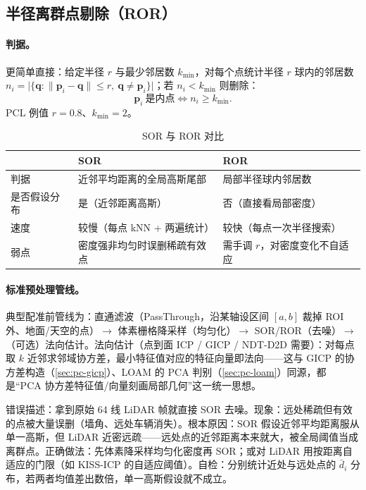 \subsection{半径离群点剔除（ROR）}
\label{sec:pc-ror}

\paragraph{判据。}
更简单直接：给定半径 $r$ 与最少邻居数 $k_{\min}$，对每个点统计半径 $r$ 球内的邻居数 $n_i=\big|\{\mathbf{q}:\|\mathbf{p}_i-\mathbf{q}\|\le r,\ \mathbf{q}\ne\mathbf{p}_i\}\big|$；若 $n_i<k_{\min}$ 则删除：
\begin{equation}
  \mathbf{p}_i\ \text{是内点}\iff n_i\ge k_{\min}.
  \label{eq:pc-ror}
\end{equation}
PCL 例值 $r=0.8$、$k_{\min}=2$\cite{rusu2011pcl}。

\begin{table}[H]\centering\small
\caption{SOR 与 ROR 对比}
\label{tab:pc-sor-ror}
\begin{tabular}{lll}
\toprule
 & SOR & ROR \\
\midrule
判据 & 近邻平均距离的全局高斯尾部 & 局部半径球内邻居数 \\
是否假设分布 & 是（近邻距离高斯） & 否（直接看局部密度） \\
速度 & 较慢（每点 kNN + 两遍统计） & 较快（每点一次半径搜索） \\
弱点 & 密度强非均匀时误删稀疏有效点 & 需手调 $r$，对密度变化不自适应 \\
\bottomrule
\end{tabular}
\end{table}

\paragraph{标准预处理管线。}
典型配准前管线为：直通滤波（PassThrough，沿某轴设区间 $[a,b]$ 裁掉 ROI 外、地面/天空的点）$\to$ 体素栅格降采样（均匀化）$\to$ SOR/ROR（去噪）$\to$（可选）法向估计。法向估计（点到面 ICP / GICP / NDT-D2D 需要）：对每点取 $k$ 近邻求邻域协方差，最小特征值对应的特征向量即法向——这与 GICP 的协方差构造（\cref{sec:pc-gicp}）、LOAM 的 PCA 判别（\cref{sec:pc-loam}）同源，都是“PCA 协方差特征值/向量刻画局部几何”这一统一思想。

\begin{pitfall}
错误描述：拿到原始 64 线 LiDAR 帧就直接 SOR 去噪。现象：远处稀疏但有效的点被大量误删（墙角、远处车辆消失）。根本原因：SOR 假设近邻平均距离服从单一高斯，但 LiDAR 近密远疏——远处点的近邻距离本来就大，被全局阈值当成离群点。正确做法：先体素降采样均匀化密度再 SOR；或对 LiDAR 用按距离自适应的门限（如 KISS-ICP 的自适应阈值）。自检：分别统计近处与远处点的 $\bar{d}_i$ 分布，若两者均值差出数倍，单一高斯假设就不成立。
\end{pitfall}

